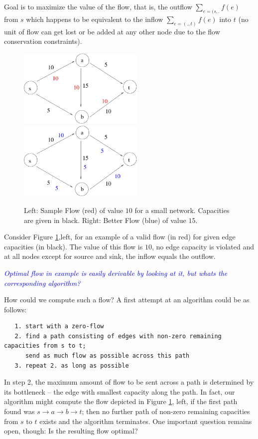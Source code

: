 \documentclass{article}
\begin{document}
Goal is to maximize the value of the flow, that is, the outflow $\sum_{e=(s,.}f(e)$ from $s$ which happens to be equivalent to the inflow $\sum_{e=(.,t)} f(e)$ into $t$ (no unit of flow can get lost or be added at any other node due to the flow conservation constraints).

\begin{figure}
\begin{center}
\includegraphics[width=6cm]{Figs/flow1.pdf} 
\hspace{1cm}
\includegraphics[width=6cm]{Figs/flow1b.pdf}
\end{center}
\caption{Left: Sample Flow (red) of value $10$ for a small network. Capacities are given in black. Right: Better Flow (blue) of value $15$.}\label{fig:flow1}
\end{figure}

Consider Figure \ref{fig:flow1},left, for an example of a valid flow (in red) for given edge capacities (in black). The value of this flow is $10$, no edge capacity is violated and at all nodes except for source and sink, the inflow equals the outflow.

\textcolor{blue}{\emph{Optimal flow in example is easily derivable by looking at it, but whats the corresponding algorithm?}}

How could we compute such a flow? A first attempt at an algorithm could be as follows:
\begin{verbatim}
   1. start with a zero-flow
   2. find a path consisting of edges with non-zero remaining capacities from s to t;
      send as much flow as possible across this path 
   3. repeat 2. as long as possible
\end{verbatim}
In step 2, the maximum amount of flow to be sent across a path is determined by its bottleneck -- the edge with smallest capacity along the path.
In fact, our algorithm might compute the flow depicted in Figure \ref{fig:flow1}, left, if the first path found was $s\rightarrow a\rightarrow b\rightarrow t$; then no further path of non-zero remaining capacities from $s$ to $t$ exists and the algorithm terminates. One important question remains open, though: Is the resulting flow optimal?
\end{document}
